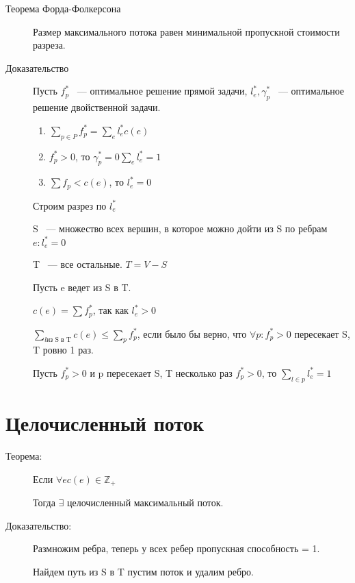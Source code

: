 \documentclass[12pt]{article}
\begin{document}
\begin{description}
\begin{description}
\item[Теорема Форда-Фолкерсона] Размер максимального потока равен минимальной пропускной стоимости разреза.

\item[Доказательство] Пусть $f_p^*$ ~--- оптимальное решение прямой задачи, $l_e^*, \gamma_p^*$ ~--- оптимальное решение двойственной задачи. 

\begin{enumerate}

\item $\sum_{p \in P}f^*_p = \sum_e l_e^* c(e)$
\item $f_p^* >0$, то $\gamma_p^* = 0 \sum_e l_e^* = 1$

\item $\sum f_p < c(e)$, то $l^*_e = 0$
\end{enumerate}

Строим разрез по $l^*_e$

S ~--- множество всех вершин, в которое можно дойти из S по ребрам $e: l^*_e = 0$

T ~--- все остальные. $T = V - S$

Пусть e ведет из S в T.

$c(e) = \sum f^*_p$, так как $l^*_e > 0$

$\sum_{l \text{из S в T}}c(e) \le \sum_{p} f^*_p$, если было бы верно, что $\forall p: f^*_p > 0$ пересекает S, T ровно 1 раз.

Пусть $f_p^* > 0$ и p пересекает S, T несколько раз $f_p^* > 0$, то $\sum_{l \in p}l_e^* = 1$

\end{description}

\section{Целочисленный поток}
\begin{description}
\item[Теорема:]

Если $\forall e c(e) \in \mathbb Z_+$

Тогда $\exists$ целочисленный максимальный поток.

\item[Доказательство:]

Размножим ребра, теперь у всех ребер пропускная способность = 1.

Найдем путь из S в T пустим поток и удалим ребро. 


\end{description}
\end{description}
\end{document}
